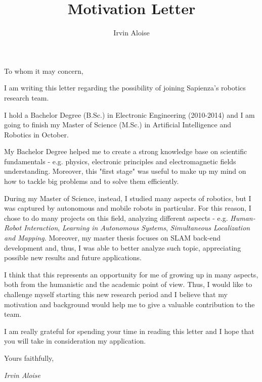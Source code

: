 \documentclass[12pt,a4paper, notitlepage]{report}
\title{Motivation Letter}
\author{Irvin Aloise}
\date{}
\begin{document}
\begin{flushright}
To whom it may concern, \\
\end{flushright}
\vspace{10px}

I am writing this letter regarding the possibility of joining Sapienza's robotics research team.

I hold a Bachelor Degree (B.Sc.) in Electronic Engineering (2010-2014) and I am going to finish my Master of Science (M.Sc.) in Artificial Intelligence and Robotics in October. 

My Bachelor Degree helped me to create a strong knowledge base on scientific fundamentals - e.g. physics, electronic principles and electromagnetic fields understanding. Moreover, this "first stage" was useful to make up my mind on how to tackle big problems and to solve them efficiently.

During my Master of Science, instead, I studied many aspects of robotics, but I was captured by autonomous and mobile robots in particular. For this reason, I chose to do many projects on this field, analyzing different aspects - e.g. \textit{Human-Robot Interaction}, \textit{Learning in Autonomous Systems}, \textit{Simultaneous Localization and Mapping}. Moreover, my master thesis focuses on SLAM back-end development and, thus, I was able to better analyze such topic, appreciating possible new results and future applications.

I think that this represents an opportunity for me of growing up in many aspects, both from the humanistic and the academic point of view. Thus, I would like to challenge myself starting this new research period and I believe that my motivation and background would help me to give a valuable contribution to the team. 

\vspace{5px}

I am really grateful for spending your time in reading this letter and I hope that you will take in consideration my application.

\vspace{20px}
Yours faithfully,
\vspace{5px}

\begin{flushright}
    \textit{Irvin Aloise}
\end{flushright}
\end{document}

